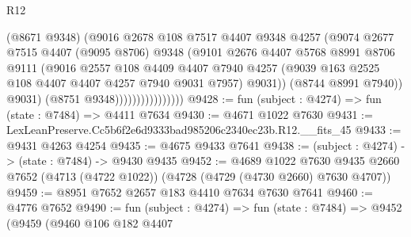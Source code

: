 \begin{lexlean}{R12}
\begin{coremodule}
                                  (@8671 @9348)
                                  (@9016
                                    @2678
                                    @108
                                    @7517
                                    @4407
                                    @9348
                                    @4257
                                    (@9074
                                      @2677
                                      @7515
                                      @4407
                                      (@9095 @8706)
                                      @9348
                                      (@9101
                                        @2676
                                        @4407
                                        @5768
                                        @8991
                                        @8706
                                        @9111
                                        (@9016
                                          @2557
                                          @108
                                          @4409
                                          @4407
                                          @7940
                                          @4257
                                          (@9039
                                            @163
                                            @2525
                                            @108
                                            @4407
                                            @4407
                                            @4257
                                            @7940
                                            @9031
                                            @7957)
                                          @9031))
                                      (@8744 @8991 @7940))
                                    @9031)
                                  (@8751 @9348))))))))))))))))
@9428 := fun (subject : @4274) => fun (state : @7484) => @4411 @7634
@9430 := @4671 @1022 @7630
@9431 := LexLeanPreserve.Cc5b6f2e6d9333bad985206c2340ec23b.R12.__fits_45
@9433 := @9431 @4263 @4254
@9435 := @4675 @9433 @7641
@9438 := (subject : @4274) -> (state : @7484) -> @9430 @9435
@9452 := @4689
    @1022
    @7630
    @9435
    @2660
    @7652
    (@4713 (@4722 @1022))
    (@4728 (@4729 (@4730 @2660) @7630 @4707))
@9459 := @8951 @7652 @2657 @183 @4410 @7634 @7630 @7641
@9460 := @4776 @7652
@9490 := fun (subject : @4274) =>
  fun (state : @7484) =>
  @9452
    (@9459
      (@9460
        @106
        @182
        @4407

\end{coremodule}
\end{lexlean}
